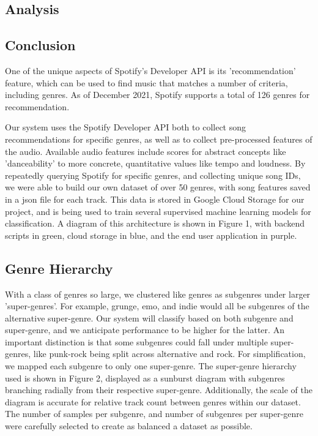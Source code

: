 \documentclass[conference]{IEEEtran}
\begin{document}
\subsection{Analysis}

\subsection{Conclusion}
One of the unique aspects of Spotify's Developer API is its 'recommendation' feature, which can be used to find music that matches a number of criteria, including genres. As of December 2021, Spotify supports a total of 126 genres for recommendation. 

Our system uses the Spotify Developer API both to collect song recommendations for specific genres, as well as to collect pre-processed features of the audio. Available audio features include scores for abstract concepts like 'danceability' to more concrete, quantitative values like tempo and loudness. By repeatedly querying Spotify for specific genres, and collecting unique song IDs, we were able to build our own dataset of over 50 genres, with song features saved in a json file for each track. This data is stored in Google Cloud Storage for our project, and is being used to train several supervised machine learning models for classification. A diagram of this architecture is shown in Figure 1, with backend scripts in green, cloud storage in blue, and the end user application in purple.

\subsection{Genre Hierarchy}
With a class of genres so large, we clustered like genres as subgenres under larger 'super-genres'. For example, grunge, emo, and indie would all be subgenres of the alternative super-genre. Our system will classify based on both subgenre and super-genre, and we anticipate performance to be higher for the latter. An important distinction is that some subgenres could fall under multiple super-genres, like punk-rock being split across alternative and rock. For simplification, we mapped each subgenre to only one super-genre. The super-genre hierarchy used is shown in Figure 2, displayed as a sunburst diagram with subgenres branching radially from their respective super-genre. Additionally, the scale of the diagram is accurate for relative track count between genres within our dataset. The number of samples per subgenre, and number of subgenres per super-genre were carefully selected to create as balanced a dataset as possible.
\end{document}

